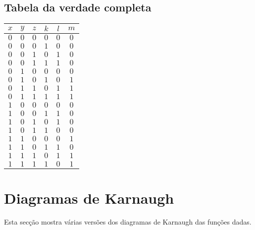 \documentclass [15pt,a4paper,twoside]{article}
\begin{document}
\subsection{Tabela da verdade completa}
\begin{center}
\begin{tabular}{cccc|cc}
$x$&$y$&$z$&$k$&$l$&$m$\\
\hline
$0$&$0$&$0$&$0$&$0$&$0$\\
$0$&$0$&$0$&$1$&$0$&$0$\\
$0$&$0$&$1$&$0$&$1$&$0$\\
$0$&$0$&$1$&$1$&$1$&$0$\\
$0$&$1$&$0$&$0$&$0$&$0$\\
$0$&$1$&$0$&$1$&$0$&$1$\\
$0$&$1$&$1$&$0$&$1$&$1$\\
$0$&$1$&$1$&$1$&$1$&$1$\\
$1$&$0$&$0$&$0$&$0$&$0$\\
$1$&$0$&$0$&$1$&$1$&$0$\\
$1$&$0$&$1$&$0$&$1$&$0$\\
$1$&$0$&$1$&$1$&$0$&$0$\\
$1$&$1$&$0$&$0$&$0$&$1$\\
$1$&$1$&$0$&$1$&$1$&$0$\\
$1$&$1$&$1$&$0$&$1$&$1$\\
$1$&$1$&$1$&$1$&$0$&$1$\\

\end{tabular}
\end{center}
\section{Diagramas de Karnaugh}
Esta secção mostra várias versões dos diagramas de Karnaugh das funções dadas.
\end{document}
